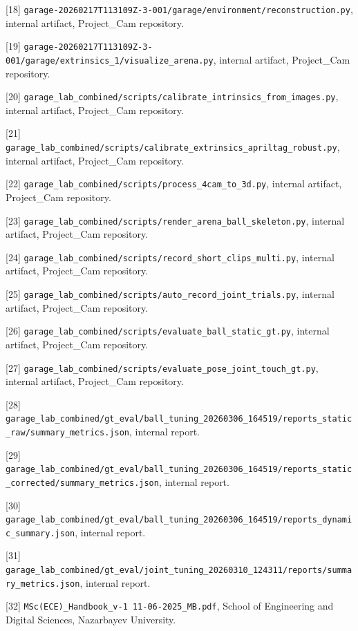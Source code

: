 [18] \texttt{garage-20260217T113109Z-3-001/garage/environment/reconstruction.py}, internal artifact, Project\_Cam repository.

[19] \texttt{garage-20260217T113109Z-3-001/garage/extrinsics\_1/visualize\_arena.py}, internal artifact, Project\_Cam repository.

[20] \texttt{garage\_lab\_combined/scripts/calibrate\_intrinsics\_from\_images.py}, internal artifact, Project\_Cam repository.

[21] \texttt{garage\_lab\_combined/scripts/calibrate\_extrinsics\_apriltag\_robust.py}, internal artifact, Project\_Cam repository.

[22] \texttt{garage\_lab\_combined/scripts/process\_4cam\_to\_3d.py}, internal artifact, Project\_Cam repository.

[23] \texttt{garage\_lab\_combined/scripts/render\_arena\_ball\_skeleton.py}, internal artifact, Project\_Cam repository.

[24] \texttt{garage\_lab\_combined/scripts/record\_short\_clips\_multi.py}, internal artifact, Project\_Cam repository.

[25] \texttt{garage\_lab\_combined/scripts/auto\_record\_joint\_trials.py}, internal artifact, Project\_Cam repository.

[26] \texttt{garage\_lab\_combined/scripts/evaluate\_ball\_static\_gt.py}, internal artifact, Project\_Cam repository.

[27] \texttt{garage\_lab\_combined/scripts/evaluate\_pose\_joint\_touch\_gt.py}, internal artifact, Project\_Cam repository.

[28] \texttt{garage\_lab\_combined/gt\_eval/ball\_tuning\_20260306\_164519/reports\_static\_raw/summary\_metrics.json}, internal report.

[29] \texttt{garage\_lab\_combined/gt\_eval/ball\_tuning\_20260306\_164519/reports\_static\_corrected/summary\_metrics.json}, internal report.

[30] \texttt{garage\_lab\_combined/gt\_eval/ball\_tuning\_20260306\_164519/reports\_dynamic\_summary.json}, internal report.

[31] \texttt{garage\_lab\_combined/gt\_eval/joint\_tuning\_20260310\_124311/reports/summary\_metrics.json}, internal report.

[32] \texttt{MSc(ECE)\_Handbook\_v-1 11-06-2025\_MB.pdf}, School of Engineering and Digital Sciences, Nazarbayev University.
